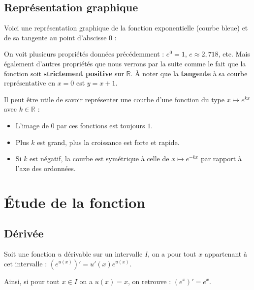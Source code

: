 	\subsection{Représentation graphique}

	Voici une représentation graphique de la fonction exponentielle (courbe bleue) et de sa tangente au point d'abscisse $0$ :


	On voit plusieurs propriétés données précédemment : $e^0 = 1$, $e \approx 2,718$, etc. Mais également d'autres propriétés que nous verrons par la suite comme le fait que la fonction soit \textbf{strictement positive} sur $\mathbb{R}$. À noter que la \textbf{tangente} à sa courbe représentative en $x = 0$ est $y = x + 1$.

	\begin{tip}
		Il peut être utile de savoir représenter une courbe d'une fonction du type $x \mapsto e^{kx}$ avec $k \in \mathbb{R}$ :
		\begin{itemize}
			\item L'image de $0$ par ces fonctions est toujours $1$.
			\item Plus $k$ est grand, plus la croissance est forte et rapide.
			\item Si $k$ est négatif, la courbe est symétrique à celle de $x \mapsto e^{-kx}$ par rapport à l'axe des ordonnées.
		\end{itemize}
	\end{tip}

	\section{Étude de la fonction}

	\subsection{Dérivée}

	\begin{formula}
		Soit une fonction $u$ dérivable sur un intervalle $I$, on a pour tout $x$ appartenant à cet intervalle : $(e^{u(x)})' = u'(x)e^{u(x)}$.
	\end{formula}

	\begin{formula}[Dérivée]
		Ainsi, si pour tout $x \in I$ on a $u(x) = x$, on retrouve : $({e^x})' = e^x$.
	\end{formula}

